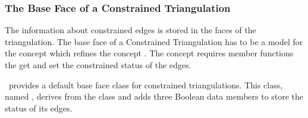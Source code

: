 \subsubsection{The Base Face of a Constrained Triangulation}
 The information about constrained edges is stored in the 
faces of the triangulation. The base face of a Constrained Triangulation
has to be a model for the concept 
which refines the concept .
The concept 
requires  member functions
 the get and set the constrained status of the edges.

\cgal\ provides a default base face class
for constrained triangulations. This class, named
,
derives from the class
and adds three Boolean data members to store the status of its edges. 


